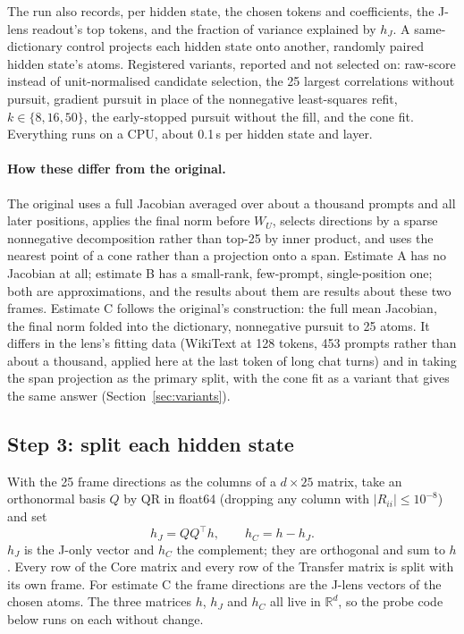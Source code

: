 \documentclass[11pt,a4paper]{article}
\newcommand{\WU}{W_U}
\newcommand{\hJ}{h_J}
\newcommand{\hC}{h_C}
\begin{document}
The run also records, per hidden state, the chosen tokens and coefficients, the J-lens readout's top tokens, and the fraction of variance explained by $\hJ$. A same-dictionary control projects each hidden state onto another, randomly paired hidden state's atoms. Registered variants, reported and not selected on: raw-score instead of unit-normalised candidate selection, the 25 largest correlations without pursuit, gradient pursuit in place of the nonnegative least-squares refit, $k\in\{8,16,50\}$, the early-stopped pursuit without the fill, and the cone fit. Everything runs on a CPU, about 0.1\,s per hidden state and layer.

\paragraph{How these differ from the original.} The original uses a full Jacobian averaged over about a thousand prompts and all later positions, applies the final norm before $\WU$, selects directions by a sparse nonnegative decomposition rather than top-25 by inner product, and uses the nearest point of a cone rather than a projection onto a span. Estimate A has no Jacobian at all; estimate B has a small-rank, few-prompt, single-position one; both are approximations, and the results about them are results about these two frames. Estimate C follows the original's construction: the full mean Jacobian, the final norm folded into the dictionary, nonnegative pursuit to 25 atoms. It differs in the lens's fitting data (WikiText at 128 tokens, 453 prompts rather than about a thousand, applied here at the last token of long chat turns) and in taking the span projection as the primary split, with the cone fit as a variant that gives the same answer (Section~\ref{sec:variants}).

\subsection{Step 3: split each hidden state}

With the 25 frame directions as the columns of a $d\times25$ matrix, take an orthonormal basis $Q$ by QR in float64 (dropping any column with $|R_{ii}|\le10^{-8}$) and set
\begin{equation}
\hJ = QQ^{\top}h, \qquad \hC = h - \hJ .
\end{equation}
$\hJ$ is the J-only vector and $\hC$ the complement; they are orthogonal and sum to $h$. Every row of the Core matrix and every row of the Transfer matrix is split with its own frame. For estimate C the frame directions are the J-lens vectors of the chosen atoms. The three matrices $h$, $\hJ$ and $\hC$ all live in $\mathbb{R}^{d}$, so the probe code below runs on each without change.
\end{document}
